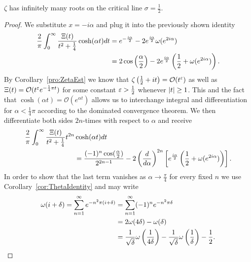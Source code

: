 \begin{theorem}
	$\zeta$ has infinitely many roots on the critical line $\sigma = \frac{1}{2}$.
\end{theorem}
\begin{proof}
	We substitute $x = -i \alpha$ and plug it into the previously shown identity
\begin{equation*}
\begin{aligned}
	\frac{2}{\pi} \int _0 ^{\infty} \frac{\Xi(t)}{t^2 + \frac{1}{4}} \cosh(\alpha t) dt 
	&= e^{-\frac{i \alpha}{2}} - 2e^{\frac{i \alpha}{2}} \omega(e^{2 i \alpha}) \\
	&= 2 \cos\left(\frac{\alpha}{2}\right) - 2e^{\frac{i \alpha}{2}} \left(\frac{1}{2} + \omega(e^{2 i \alpha})\right).
\end{aligned}
\end{equation*}
	By Corollary~\ref{pro:ZetaEst} we know that $\zeta\left(\frac{1}{2} + it\right) = \mathcal{O}(t^\varepsilon)$ as well as $\Xi(t) = \mathcal{O}(t^\varepsilon e^{-\frac{1}{4} \pi t})$ for some constant $\varepsilon > \frac{1}{2}$ whenever $\left|t\right| \geq 1$. This and the fact that $\cosh(\alpha t) = \mathcal{O}(e^{\alpha t})$ allows us to interchange integral and differentiation for $\alpha < \frac{1}{4} \pi$ according to the dominated convergence theorem. We then differentiate both sides $2n$-times with respect to $\alpha$ and receive
\begin{equation*}
\begin{aligned}	
	\frac{2}{\pi} \int _0 ^{\infty} \frac{\Xi(t)}{t^2 + \frac{1}{4}} t^{2n}
		&\cosh(\alpha t) dt \\
		&= \frac{(-1)^{n} \cos(\frac{\alpha}{2})}{2^{2n - 1}} - 2 \left(\frac{d}{d\alpha}\right)^{2n} \left[e^{\frac{i \alpha}{2}} \left(\frac{1}{2} + \omega(e^{2 i \alpha})\right)\right].
\end{aligned}
\end{equation*}
	In order to show that the last term vanishes as $\alpha \to \frac{\pi}{4}$ for every fixed $n$ we use Corollary~\ref{cor:ThetaIdentity} and may write
\begin{equation*}
\begin{aligned}
	\omega(i + \delta) = \sum _{n=1} ^{\infty} e^{-n^2 \pi (i + \delta)}
		&= \sum _{n=1} ^{\infty} (-1)^n e^{-n^2 \pi \delta} \\
		&= 2 \omega(4 \delta) - \omega(\delta) \\
		&= \frac{1}{\sqrt \delta} \omega\left(\frac{1}{4\delta}\right) - \frac{1}{\sqrt \delta} \omega\left(\frac{1}{\delta}\right) - \frac{1}{2}.
\end{aligned}
\end{equation*}

\end{proof}
